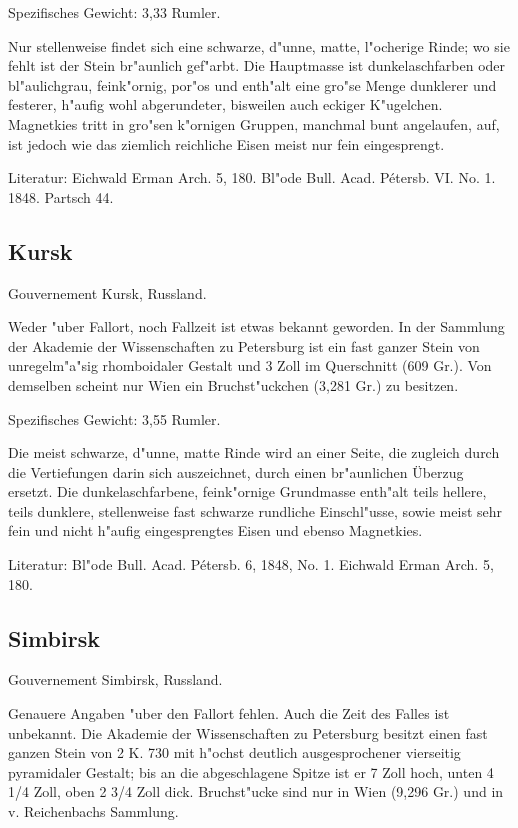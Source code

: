 \documentclass[a4paper, 11pt, oneside]{article}
\begin{document}
Spezifisches Gewicht: 3,33 Rumler.

Nur stellenweise findet sich eine schwarze, d"unne, matte, l"ocherige Rinde; wo sie fehlt ist der Stein br"aunlich gef"arbt. Die Hauptmasse ist dunkelaschfarben oder bl"aulichgrau, feink"ornig, por"os und enth"alt eine gro"se Menge dunklerer und festerer, h"aufig wohl abgerundeter, bisweilen auch eckiger K"ugelchen. Magnetkies tritt in gro"sen k"ornigen Gruppen, manchmal bunt angelaufen, auf, ist jedoch wie das ziemlich reichliche Eisen meist nur fein eingesprengt.

Literatur: Eichwald Erman Arch. 5, 180. Bl"ode Bull. Acad. Pétersb. VI. No. 1. 1848. Partsch 44.

\subsection{Kursk}

Gouvernement Kursk, Russland.

Weder "uber Fallort, noch Fallzeit ist etwas bekannt geworden. In der Sammlung der Akademie der Wissenschaften zu Petersburg ist ein fast ganzer Stein von unregelm"a"sig rhomboidaler Gestalt und 3 Zoll im Querschnitt (609 Gr.). Von demselben scheint nur Wien ein Bruchst"uckchen (3,281 Gr.) zu besitzen.

Spezifisches Gewicht: 3,55 Rumler.

Die meist schwarze, d"unne, matte Rinde wird an einer Seite, die zugleich durch die Vertiefungen darin sich auszeichnet, durch einen br"aunlichen Überzug ersetzt. Die dunkelaschfarbene, feink"ornige Grundmasse enth"alt teils hellere, teils dunklere, stellenweise fast schwarze rundliche Einschl"usse, sowie meist sehr fein und nicht h"aufig eingesprengtes Eisen und ebenso Magnetkies.

Literatur: Bl"ode Bull. Acad. Pétersb. 6, 1848, No. 1. Eichwald Erman Arch. 5, 180.

\subsection{Simbirsk}

Gouvernement Simbirsk, Russland.

Genauere Angaben "uber den Fallort fehlen. Auch die Zeit des Falles ist unbekannt. Die Akademie der Wissenschaften zu Petersburg besitzt einen fast ganzen Stein von 2 K. 730 mit h"ochst deutlich ausgesprochener vierseitig pyramidaler Gestalt; bis an die abgeschlagene Spitze ist er 7 Zoll hoch, unten 4 1/4 Zoll, oben 2 3/4 Zoll dick. Bruchst"ucke sind nur in Wien (9,296 Gr.) und in v. Reichenbachs Sammlung.
\end{document}
